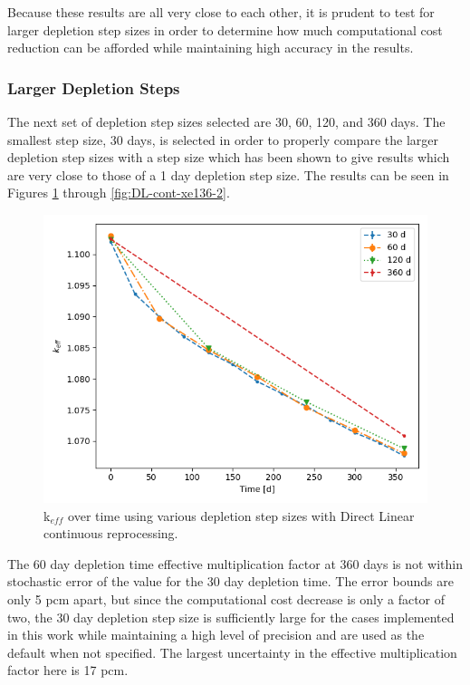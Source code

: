 Because these results are all very close to each other, it is prudent to test for larger depletion step sizes in order to determine how much computational cost reduction can be afforded while maintaining high accuracy in the results.

\subsubsection{Larger Depletion Steps}

The next set of depletion step sizes selected are 30, 60, 120, and 360 days. The smallest step size, 30 days, is selected in order to properly compare the larger depletion step sizes with a step size which has been shown to give results which are very close to those of a 1 day depletion step size. The results can be seen in Figures \ref{fig:DL-cont-k-2} through \ref{fig:DL-cont-xe136-2}.

\begin{figure}[H]
  \centering
  \includegraphics[scale=0.7]{images/DL_NSTEP_keff-large.png}
  \caption{k$_{eff}$ over time using various depletion step sizes with Direct Linear continuous reprocessing.}
   \label{fig:DL-cont-k-2}
\end{figure}

The 60 day depletion time effective multiplication factor at 360 days is not within stochastic error of the value for the 30 day depletion time. The error bounds are only 5 pcm apart, but since the computational cost decrease is only a factor of two, the 30 day depletion step size is sufficiently large for the cases implemented in this work while maintaining a high level of precision and are used as the default when not specified.
The largest uncertainty in the effective multiplication factor here is 17 pcm.

